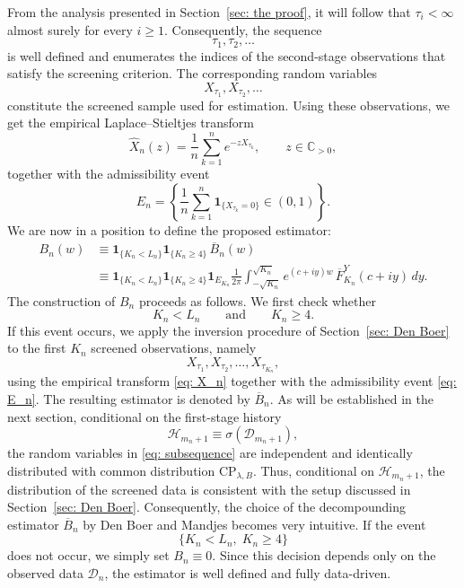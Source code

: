 \documentclass[12pt]{article}
\newcommand{\1}{\mathbf{1}}
\begin{document}
From the analysis presented in Section~\ref{sec: the proof}, it will follow that $\tau_i<\infty$ almost surely for every $i\geq 1$. Consequently, the sequence
\[
\tau_1,\tau_2,\ldots
\]
is well defined and enumerates the indices of the second-stage observations that satisfy the screening criterion. The corresponding random variables
\[
X_{\tau_1},X_{\tau_2},\ldots
\]
constitute the screened sample used for estimation. Using these observations, we get the empirical Laplace--Stieltjes transform \begin{equation}\label{eq: X_n} \widehat X_n(z) = \frac1n \sum_{k=1}^{n} e^{-zX_{\tau_k}}, \qquad z\in\mathbb C_{>0}, \end{equation} together with the admissibility event \begin{equation}\label{eq: E_n} E_n = \left\{ \frac1n \sum_{k=1}^{n} \mathbf1_{\{X_{\tau_k}=0\}} \in(0,1) \right\}. \end{equation} We are now in a position to define the proposed estimator: \begin{align} B_n(w) &\equiv \mathbf1_{\{K_n<L_n\}} \mathbf1_{\{K_n\ge4\}} \,\overline B_n(w) \label{eq: estimator}\\ &\equiv \mathbf1_{\{K_n<L_n\}} \mathbf1_{\{K_n\ge4\}} \mathbf1_{E_{K_n}} \frac1{2\pi} \int_{-\sqrt{K_n}}^{\sqrt{K_n}} e^{(c+iy)w} \, \overline F_{K_n}^{Y}(c+iy) \,dy. \nonumber \end{align} The construction of $B_n$ proceeds as follows. We first check whether \[ K_n<L_n \qquad\text{and}\qquad K_n\ge4. \] If this event occurs, we apply the inversion procedure of Section~\ref{sec: Den Boer} to the first $K_n$ screened observations, namely \begin{equation}\label{eq: subsequence} X_{\tau_1},X_{\tau_2},\ldots,X_{\tau_{K_n}}, \end{equation} using the empirical transform \eqref{eq: X_n} together with the admissibility event \eqref{eq: E_n}. The resulting estimator is denoted by $\overline B_n$. As will be established in the next section, conditional on the first-stage history \begin{equation}\label{eq: history} \mathcal H_{m_n+1}\equiv \sigma(\mathcal D_{m_n+1}), \end{equation} the random variables in \eqref{eq: subsequence} are independent and identically distributed with common distribution $\mathrm{CP}_{\lambda,B}$. Thus, conditional on $\mathcal H_{m_n+1}$, the distribution of the screened data is consistent with the setup discussed in Section~\ref{sec: Den Boer}. Consequently, the choice of the decompounding estimator $\overline B_n$ by Den Boer and Mandjes becomes very intuitive. If the event \[ \{K_n<L_n,\;K_n\ge4\} \] does not occur, we simply set $B_n\equiv0$. Since this decision depends only on the observed data $\mathcal D_n$, the estimator is well defined and fully data-driven.
\end{document}
